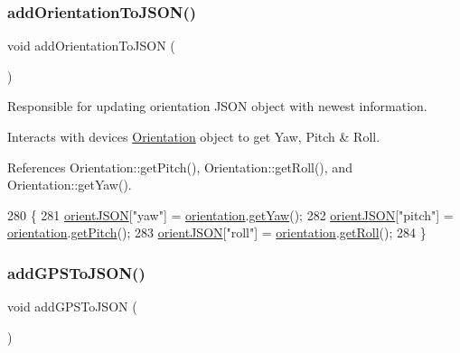 \subsubsection{\texorpdfstring{add\+Orientation\+To\+J\+S\+O\+N()}{addOrientationToJSON()}}
{\footnotesize\ttfamily void add\+Orientation\+To\+J\+S\+ON (\begin{DoxyParamCaption}{ }\end{DoxyParamCaption})}



Responsible for updating orientation J\+S\+ON object with newest information. 

Interacts with devices \hyperlink{class_orientation}{Orientation} object to get Yaw, Pitch \& Roll. 

References Orientation\+::get\+Pitch(), Orientation\+::get\+Roll(), and Orientation\+::get\+Yaw().


\begin{DoxyCode}
280 \{
281   \hyperlink{logging-device_8ino_ae8e95a76df2aaa373792e5b744a6bb73}{orientJSON}[\textcolor{stringliteral}{"yaw"}] = \hyperlink{logging-device_8ino_a47be0262307aa023a1bda3d98986a16d}{orientation}.\hyperlink{class_orientation_a3dbaa1ee014811c40d5b9f39b544c19b}{getYaw}();
282   \hyperlink{logging-device_8ino_ae8e95a76df2aaa373792e5b744a6bb73}{orientJSON}[\textcolor{stringliteral}{"pitch"}] = \hyperlink{logging-device_8ino_a47be0262307aa023a1bda3d98986a16d}{orientation}.\hyperlink{class_orientation_a7ec1a2964fc858bbd5da22a505b087c8}{getPitch}();
283   \hyperlink{logging-device_8ino_ae8e95a76df2aaa373792e5b744a6bb73}{orientJSON}[\textcolor{stringliteral}{"roll"}] = \hyperlink{logging-device_8ino_a47be0262307aa023a1bda3d98986a16d}{orientation}.\hyperlink{class_orientation_ab8923432cb8c18822b0a9ae95a5ac505}{getRoll}();
284 \}
\end{DoxyCode}
\mbox{\label{logging-device_8ino_af1705fad6a6282b24379a174e18d4fe4}} 
\subsubsection{\texorpdfstring{add\+G\+P\+S\+To\+J\+S\+O\+N()}{addGPSToJSON()}}
{\footnotesize\ttfamily void add\+G\+P\+S\+To\+J\+S\+ON (\begin{DoxyParamCaption}{ }\end{DoxyParamCaption})}



